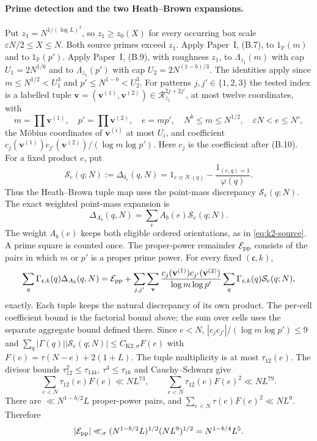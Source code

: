 \paragraph{Prime detection and the two Heath--Brown expansions.}
Put \(z_1=N^{1/(\log L)^3}\), so \(z_1\ge z_0(X)\) for every occurring
box scale \(\varepsilon N/2\le X\le N\).
Both source primes exceed \(z_1\). Apply Paper~I, (B.7), to \(1_{\mathbb P}(m)\)
and to \(1_{\mathbb P}(p')\). Apply Paper~I, (B.9), with roughness \(z_1\), to
\(\Lambda_{z_1}(m)\) with cap \(U_1=2N^{1/6}\) and to \(\Lambda_{z_1}(p')\)
with cap \(U_2=2N^{(1-b)/3}\). The identities apply since
\(m\le N^{1/2}<U_1^3\) and \(p'\le N^{1-b}<U_2^3\). For patterns
\(j,j'\in\{1,2,3\}\) the tested index is a labelled tuple
\(\mathbf v=(\mathbf v^{(1)},\mathbf v^{(2)})\in\mathcal R_{z_1}^{2j+2j'}\),
at most twelve coordinates, with
\[
 m=\textstyle\prod\mathbf v^{(1)},\quad p'=\prod\mathbf v^{(2)},\quad
 e=mp',\quad N^b\le m\le N^{1/2},\quad \varepsilon N<e\le N',
\]
the Möbius coordinates of \(\mathbf v^{(i)}\) at most \(U_i\), and coefficient
\(c_j(\mathbf v^{(1)})c_{j'}(\mathbf v^{(2)})/(\log m\log p')\).
Here \(c_j\) is the coefficient after (B.10). For a fixed product \(e\), put
\begin{equation}\label{eq:k2-pointmass-discrepancy}
 \mathcal S_e(q;N):=\Delta_{\delta_e}(q,N)
 =1_{e\equiv N\ (q)}-\frac{1_{(e,q)=1}}{\varphi(q)}.
\end{equation}
Thus the Heath--Brown tuple map uses the point-mass discrepancy
\(\mathcal S_e(q;N)\). The exact weighted point-mass expansion is
\[
 \Delta_{A_b}(q,N)=\sum_e A_b(e)\mathcal S_e(q;N).
\]
The weight \(A_b(e)\) keeps both eligible ordered orientations, as in
\eqref{eq:k2-source}. A prime square is counted once. The proper-power remainder
\(\mathcal E_{\rm pp}\) consists of the pairs in which \(m\) or \(p'\) is a
proper prime power. For every fixed \((\mathfrak c,k)\),
\begin{equation}\label{eq:k2-r3-hb-identity}
 \sum_q\Gamma_{\mathfrak c,k}(q)\Delta_{A_b}(q,N)
 =\mathcal E_{\rm pp}
 +\sum_{j,j'}\sum_{\mathbf v}
   \frac{c_j(\mathbf v^{(1)})c_{j'}(\mathbf v^{(2)})}{\log m\log p'}
   \sum_q\Gamma_{\mathfrak c,k}(q)\mathcal S_{e}(q;N),
\end{equation}
exactly. Each tuple keeps the natural discrepancy of its own product.
The per-cell coefficient bound is the factorial bound above; the sum over
cells uses the separate aggregate bound defined there.
Since \(e<N\), \(|c_jc_{j'}|/(\log m\log p')\le9\) and
\(\sum_q|\Gamma(q)||\mathcal S_e(q;N)|\le C_{\mathrm{K2},\sigma} F(e)\) with
\(F(e)=\tau(N-e)+2(1+L)\). The tuple multiplicity is at most
\(\tau_{12}(e)\). The divisor bounds \(\tau_{12}^2\le\tau_{144}\),
\(\tau^4\le\tau_{16}\) and Cauchy--Schwarz give
\begin{equation}\label{eq:k2-r3-moments}
 \sum_{e<N}\tau_{12}(e)F(e)\ll NL^{73},\qquad
 \sum_{e<N}\tau_{12}(e)F(e)^2\ll NL^{79}.
\end{equation}
There are \(\ll N^{1-b/2}L\) proper-power pairs, and
\(\sum_{e<N}\tau(e)F(e)^2\ll NL^9\). Therefore
\begin{equation}\label{eq:k2-r3-pp}
 |\mathcal E_{\rm pp}|\ll_\sigma(N^{1-b/2}L)^{1/2}(NL^9)^{1/2}
 =N^{1-b/4}L^5 .
\end{equation}

